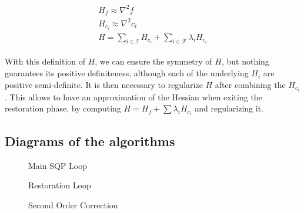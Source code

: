 \begin{align}
  \begin{split}
    H_f \approx \nabla^2 f\\
    H_{c_i} \approx \nabla^2 c_i\\
    H = \sum_{i\in \mathcal{I}}H_{c_i} + \sum_{i\in \mathcal{F}}\lambda_i H_{c_i}
  \end{split}
\end{align}

With this definition of $H$, we can ensure the symmetry of $H$, but nothing guarantees its positive definiteness, although each of the underlying $H_i$ are positive semi-definite.
It is then necessary to regularize $H$ after combining the $H_{c_i}$.
This allows to have an approximation of the Hessian when exiting the restoration phase, by computing $H = H_f + \sum \lambda_i H_{c_i}$ and regularizing it.

\subsection{Diagrams of the algorithms}
\label{sub:diagrams_of_the_algorithms}

\begin{figure}[htpb]
  \centering
  
  \caption{Main SQP Loop}
\label{fig:main_sqp_loop}
\end{figure}

\begin{figure}[htpb]
  \begin{minipage}{.5\textwidth}
    \centering
    
    \caption{Restoration Loop}
\label{fig:restoration_loop}
  \end{minipage}%
  \begin{minipage}{.5\textwidth}
    \centering
    
    \caption{Second Order Correction}
\label{fig:second_order_correction}
  \end{minipage}%
\end{figure}



